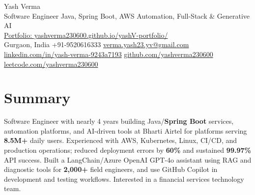 \documentclass[letterpaper,11pt]{article}
\begin{document}
\begin{center}
  {\Huge Yash Verma} \\
  \small Software Engineer \textbar{} Java, Spring Boot, AWS \textbar{} Automation, Full-Stack \& Generative AI \\
  \href{https://yashverma230600.github.io/yashV-portfolio/}{Portfolio: yashverma230600.github.io/yashV-portfolio/} \\
  \vspace{8pt}
  \small
  Gurgaon, India \textbar{}
  +91-9520616333 \textbar{}
  \href{mailto:verma.yash23.yv@gmail.com}{verma.yash23.yv@gmail.com} \textbar{}
  \href{https://www.linkedin.com/in/yash-verma-9243a7193/}{linkedin.com/in/yash-verma-9243a7193} \textbar{}
  \href{https://github.com/yashverma230600}{github.com/yashverma230600} \textbar{}
  \href{https://leetcode.com/yashverma230600}{leetcode.com/yashverma230600}
  \vspace{-8pt}
\end{center}

\section{Summary}
\begin{itemize}[leftmargin=0.15in, label={}]
  \small{\item{
    Software Engineer with nearly 4 years building Java/\textbf{Spring Boot} services, automation platforms, and AI-driven tools at Bharti Airtel for platforms serving \textbf{8.5M+} daily users. Experienced with AWS, Kubernetes, Linux, CI/CD, and production operations; reduced deployment errors by \textbf{60\%} and sustained \textbf{99.97\%} API success. Built a LangChain/Azure OpenAI GPT-4o assistant using RAG and diagnostic tools for \textbf{2,000+} field engineers, and use GitHub Copilot in development and testing workflows. Interested in a financial services technology team.
  }}
\end{itemize}
\vspace{-8pt}

\end{document}
